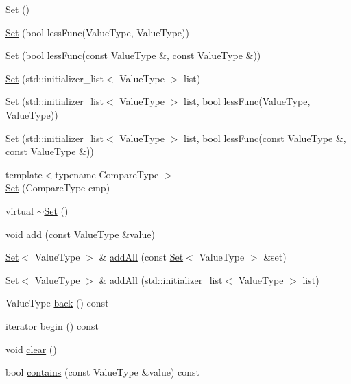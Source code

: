 \begin{DoxyCompactItemize}
\item 
\mbox{\hyperlink{classSet_ad2293f668ddb9a9fc99f78a737f6e86e}{Set}} ()
\item 
\mbox{\hyperlink{classSet_aebae7de55448c35012838560a7721060}{Set}} (bool less\+Func(Value\+Type, Value\+Type))
\item 
\mbox{\hyperlink{classSet_a22b821fcf521183327753dec78530f36}{Set}} (bool less\+Func(const Value\+Type \&, const Value\+Type \&))
\item 
\mbox{\hyperlink{classSet_a914062b091ae2bcd6945e702dc700dd2}{Set}} (std\+::initializer\+\_\+list$<$ Value\+Type $>$ list)
\item 
\mbox{\hyperlink{classSet_a865d21af08e175e4f04cceee1e02e0d2}{Set}} (std\+::initializer\+\_\+list$<$ Value\+Type $>$ list, bool less\+Func(Value\+Type, Value\+Type))
\item 
\mbox{\hyperlink{classSet_aa928b08304d74b8d30ce76fb831cec5e}{Set}} (std\+::initializer\+\_\+list$<$ Value\+Type $>$ list, bool less\+Func(const Value\+Type \&, const Value\+Type \&))
\item 
{\footnotesize template$<$typename Compare\+Type $>$ }\\\mbox{\hyperlink{classSet_ab7b872ef8c76e7185adeb205f1120248}{Set}} (Compare\+Type cmp)
\item 
virtual \mbox{\hyperlink{classSet_a64c23991280aa719d76b8995d530115f}{$\sim$\+Set}} ()
\item 
void \mbox{\hyperlink{classSet_ab901606bf3a8019c986f0cf9a9f298dc}{add}} (const Value\+Type \&value)
\item 
\mbox{\hyperlink{classSet}{Set}}$<$ Value\+Type $>$ \& \mbox{\hyperlink{classSet_aae14ee5e7f12c3325b0e85115798426a}{add\+All}} (const \mbox{\hyperlink{classSet}{Set}}$<$ Value\+Type $>$ \&set)
\item 
\mbox{\hyperlink{classSet}{Set}}$<$ Value\+Type $>$ \& \mbox{\hyperlink{classSet_ae6a0476359bb28804a59192164171cb8}{add\+All}} (std\+::initializer\+\_\+list$<$ Value\+Type $>$ list)
\item 
Value\+Type \mbox{\hyperlink{classSet_a38cbd80c93f450dc9bf3ca7c6a6220bd}{back}} () const
\item 
\mbox{\hyperlink{classSet_1_1iterator}{iterator}} \mbox{\hyperlink{classSet_a0c62c15c8ed609e7e5e9518cf5f5c712}{begin}} () const
\item 
void \mbox{\hyperlink{classSet_ac8bb3912a3ce86b15842e79d0b421204}{clear}} ()
\item 
bool \mbox{\hyperlink{classSet_a6fbc1a150987e7e5320d244a3baeb560}{contains}} (const Value\+Type \&value) const

\end{DoxyCompactItemize}
